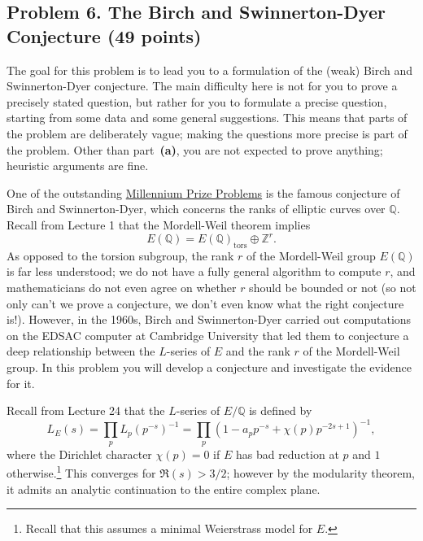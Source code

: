 \documentclass[11pt]{article}
\newcommand{\Q}{\mathbb{Q}}
\newcommand{\Z}{\mathbb{Z}}
\theoremstyle{definition}
\begin{document}
\subsection*{Problem 6. The Birch and Swinnerton-Dyer Conjecture (49 points)}

The goal for this problem is to lead you to a formulation of the (weak) Birch and Swinnerton-Dyer conjecture.
The main difficulty here is not for you to prove a precisely stated question, but rather for you to formulate a precise question, starting from some data and some general suggestions.
This means that parts of the problem are deliberately vague; making the questions more precise is part of the problem.
Other than part~\textbf{(a)}, you are not expected to prove anything; heuristic arguments are fine.

One of the outstanding \href{http://www.claymath.org/millennium-problems/millennium-prize-problems}{Millennium Prize Problems} is the famous conjecture of Birch and Swinnerton-Dyer, which concerns the ranks of elliptic curves over $\Q$.  Recall from Lecture 1 that the Mordell-Weil theorem implies
\[E(\Q) = E(\Q)_{\text{tors}} \oplus \Z^r. \]
As opposed to the torsion subgroup, the rank $r$ of the Mordell-Weil group $E(\Q)$ is far less understood; we do not have a fully general algorithm to compute $r$, and mathematicians do not even agree on whether $r$ should be bounded or not (so not only can't we prove a conjecture, we don't even know what the right conjecture is!).  However, in the 1960s, Birch and Swinnerton-Dyer carried out computations on the EDSAC computer at Cambridge University that led them to conjecture a deep relationship between the $L$-series of $E$ and the rank $r$ of the Mordell-Weil group.
In this problem you will develop a conjecture and investigate the evidence for it.

Recall from Lecture 24 that the $L$-series of $E/\Q$ is defined by
\[L_E(s) = \prod_p L_p(p^{-s})^{-1} = \prod_p (1 -a_p p^{-s} + \chi(p)p^{-2s+1})^{-1}, \]
where the Dirichlet character $\chi(p) = 0$ if $E$ has bad reduction at $p$ and $1$ otherwise.\footnote{Recall that this assumes a minimal Weierstrass model for $E$.}  This converges for $\Re(s) >3/2$; however by the modularity theorem, it admits an analytic continuation to the entire complex plane.
\end{document}
